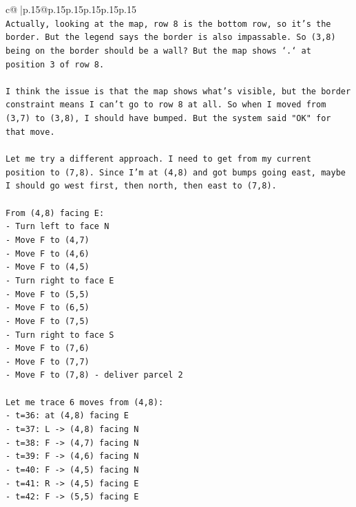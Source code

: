 \documentclass{article}
\begin{document}
{\begin{supertabular}{c@{$\;$}|p{.15\linewidth}@{}p{.15\linewidth}p{.15\linewidth}p{.15\linewidth}p{.15\linewidth}p{.15\linewidth}}
{{{\\ 
\texttt{Actually, looking at the map, row 8 is the bottom row, so it's the border. But the legend says the border is also impassable. So (3,8) being on the border should be a wall? But the map shows `.` at position 3 of row 8.} \\
\\ 
\texttt{I think the issue is that the map shows what's visible, but the border constraint means I can't go to row 8 at all. So when I moved from (3,7) to (3,8), I should have bumped. But the system said "OK" for that move.} \\
\\ 
\texttt{Let me try a different approach. I need to get from my current position to (7,8). Since I'm at (4,8) and got bumps going east, maybe I should go west first, then north, then east to (7,8).} \\
\\ 
\texttt{From (4,8) facing E:} \\
\texttt{{-} Turn left to face N} \\
\texttt{{-} Move F to (4,7)} \\
\texttt{{-} Move F to (4,6)} \\
\texttt{{-} Move F to (4,5)} \\
\texttt{{-} Turn right to face E} \\
\texttt{{-} Move F to (5,5)} \\
\texttt{{-} Move F to (6,5)} \\
\texttt{{-} Move F to (7,5)} \\
\texttt{{-} Turn right to face S} \\
\texttt{{-} Move F to (7,6)} \\
\texttt{{-} Move F to (7,7)} \\
\texttt{{-} Move F to (7,8) {-} deliver parcel 2} \\
\\ 
\texttt{Let me trace 6 moves from (4,8):} \\
\texttt{{-} t=36: at (4,8) facing E} \\
\texttt{{-} t=37: L {-}> (4,8) facing N} \\
\texttt{{-} t=38: F {-}> (4,7) facing N} \\
\texttt{{-} t=39: F {-}> (4,6) facing N} \\
\texttt{{-} t=40: F {-}> (4,5) facing N} \\
\texttt{{-} t=41: R {-}> (4,5) facing E} \\
\texttt{{-} t=42: F {-}> (5,5) facing E} \\
}}}
\end{supertabular}}
\end{document}
